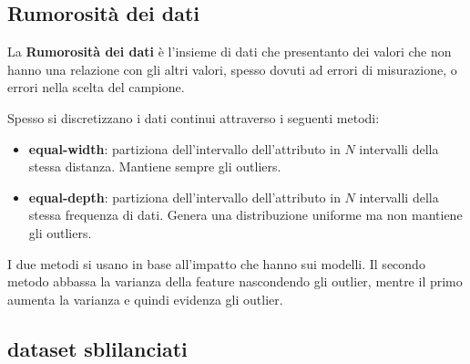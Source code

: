 \subsection{Rumorosità dei dati}
\begin{definizione} 
    La \textbf{Rumorosità dei dati} è l'insieme di dati che presentanto dei 
    valori che non hanno una relazione con gli altri valori, spesso dovuti ad errori di misurazione,
    o errori nella scelta del campione. 
\end{definizione}
Spesso si discretizzano i dati continui attraverso i seguenti metodi:
\begin{itemize}
    \item \textbf{equal-width}: partiziona dell'intervallo dell'attributo in $N$ intervalli della stessa
    distanza. Mantiene sempre gli outliers.
    \item \textbf{equal-depth}: partiziona dell'intervallo dell'attributo in $N$ intervalli della stessa
    frequenza di dati. Genera una distribuzione uniforme ma non mantiene 
    gli outliers.
\end{itemize}

I due metodi si usano in base all'impatto che hanno sui modelli. Il secondo 
metodo abbassa la varianza della feature nascondendo gli outlier, mentre il primo aumenta la varianza 
e quindi evidenza gli outlier.

\subsection{dataset sblilanciati}